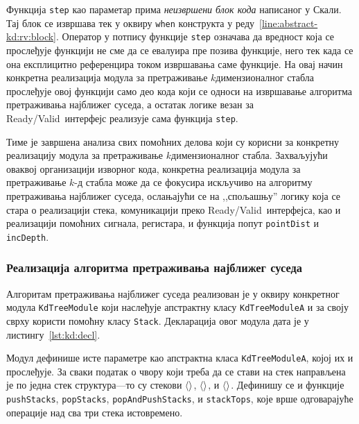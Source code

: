 \documentclass[master]{finthesis}
\newcommand*{\kdim}[1]{\texorpdfstring{$k$\Hyphdash}{k-}димензионал#1}
\newcommand*{\kd}{\texorpdfstring{$k$}{k}-д }
\newcommand*{\correctmath}[1]{%
    \ifcsname mathCorrectionFor#1\endcsname%
        \csname mathCorrectionFor#1\endcsname%
    \else%
        #1%
    \fi%
}
\newcommand*{\mfield}[1]{{\langle\correctmath{#1}\/\rangle}}
\newcommand*{\field}[1]{\texorpdfstring{$\mfield{#1}$}{⟨#1⟩}}
\newcommand{\rv}{Ready\slash Valid}
\newcommand*{\prog}[1]{\texttt{#1}}
\newcommand*{\op}[1]{\fbox{\prog{#1}}}
\newcommand*{\func}[1]{\prog{#1}}
\begin{document}
Функција \func{step} као параметар прима \emph{неизвршени блок кода} написаног у Скали. Тај блок се извршава тек у оквиру \prog{when} конструкта у реду~\ref{line:abstract-kd:rv:block}. Оператор \op{=>} у потпису функције \func{step} означава да вредност која се прослеђује функцији не сме да се евалуира пре позива функције, него тек када се она експлицитно референцира током извршавања саме функције. На овај начин конкретна реализација модула за претраживање \kdim{ног} стабла прослеђује овој функцији само део кода који се односи на извршавање алгоритма претраживања најближег суседа, а остатак логике везан за \rv\ интерфејс реализује сама функција \func{step}.

Тиме је завршена анализа свих помоћних делова који су корисни за конкретну реализацију модула за претраживање \kdim{ног} стабла. Захваљујући оваквој организацији изворног кода, конкретна реализација модула за претраживање \kd стабла може да се фокусира искључиво на алгоритму претраживања најближег суседа, ослањајући се на ,,спољашњу'' логику која се стара о реализацији стека, комуникацији преко \rv\ интерфејса, као и реализацији помоћних сигнала, регистара, и функција попут \func{pointDist} и \func{incDepth}.

\subsubsection{Реализација алгоритма претраживања најближег суседа}

Алгоритам претраживања најближег суседа реализован је у оквиру конкретног модула \prog{KdTreeModule} који наслеђује апстрактну класу \prog{KdTreeModuleA} и за своју сврху користи помоћну класу \prog{Stack}. Декларација овог модула дата је у листингу~\ref{lst:kd:decl}.

Модул дефинише исте параметре као апстрактна класа \prog{KdTreeModuleA}, којој их и прослеђује. За сваки податак о чвору који треба да се стави на стек направљена је по једна стек структура---то су стекови \field{rootStack}, \field{childStack}, и \field{depthStack}. Дефинишу се и функције \func{pushStacks}, \func{popStacks}, \func{popAndPushStacks}, и \func{stackTops}, које врше одговарајуће операције над сва три стека истовремено.
\end{document}
